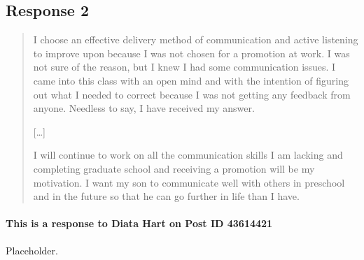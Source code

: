 
\subsection{Response 2}
  \begin{quotation}
    I choose an effective delivery method of communication and active listening
      to improve upon because I was not chosen for a promotion at work. I was
      not sure of the reason, but I knew I had some communication issues. I came
      into this class with an open mind and with the intention of figuring out
      what I needed to correct because I was not getting any feedback from
      anyone. Needless to say, I have received my answer.

    [\ldots]

    I will continue to work on all the communication skills I am lacking and
      completing graduate school and receiving a promotion will be my
      motivation. I want my son to communicate well with others in preschool
      and in the future so that he can go further in life than I have.
  \end{quotation}

  \paragraph{This is a response to Diata Hart on Post ID 43614421}
    Placeholder.
